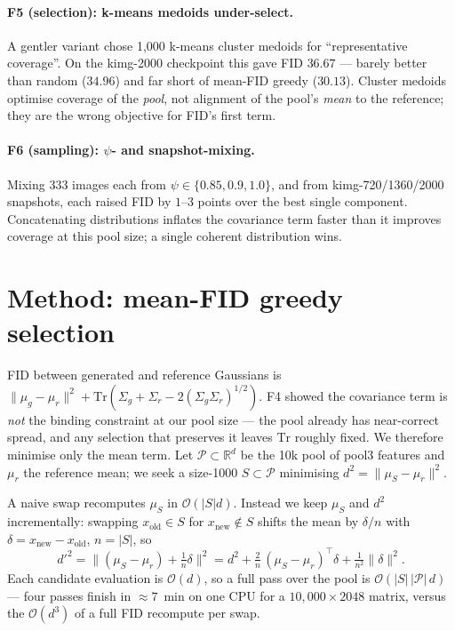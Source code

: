 \documentclass{article}
\begin{document}
\paragraph{F5 (selection): k-means medoids under-select.} A gentler variant
chose 1,000 k-means cluster medoids for ``representative coverage''. On the
kimg-2000 checkpoint this gave FID $36.67$ --- barely better than random
($34.96$) and far short of mean-FID greedy ($30.13$). Cluster medoids optimise
coverage of the \emph{pool}, not alignment of the pool's \emph{mean} to the
reference; they are the wrong objective for FID's first term.

\paragraph{F6 (sampling): $\psi$- and snapshot-mixing.} Mixing 333 images each
from $\psi\in\{0.85,0.9,1.0\}$, and from kimg-720/1360/2000 snapshots, each
raised FID by $1$--$3$ points over the best single component. Concatenating
distributions inflates the covariance term faster than it improves coverage at
this pool size; a single coherent distribution wins.

\section{Method: mean-FID greedy selection}
\label{sec:method}
FID \citep{heusel2017gans} between generated and reference Gaussians is
$\|\mu_g-\mu_r\|^2 + \mathrm{Tr}(\Sigma_g+\Sigma_r-2(\Sigma_g\Sigma_r)^{1/2})$.
F4 showed the covariance term is \emph{not} the binding constraint at our pool
size --- the pool already has near-correct spread, and any selection that
preserves it leaves $\mathrm{Tr}$ roughly fixed. We therefore minimise only the
mean term. Let $\mathcal{P}\subset\mathbb{R}^d$ be the 10k pool of pool3
features and $\mu_r$ the reference mean; we seek a size-1000 $S\subset\mathcal{P}$
minimising $d^2=\|\mu_S-\mu_r\|^2$.

A naive swap recomputes $\mu_S$ in $\mathcal{O}(|S|d)$. Instead we keep $\mu_S$
and $d^2$ incrementally: swapping $x_{\text{old}}\!\in\!S$ for
$x_{\text{new}}\!\notin\!S$ shifts the mean by $\delta/n$ with
$\delta=x_{\text{new}}-x_{\text{old}}$, $n=|S|$, so
\begin{equation}
d'^2 = \Big\|(\mu_S-\mu_r)+\tfrac{1}{n}\delta\Big\|^2
     = d^2 + \tfrac{2}{n}\,(\mu_S-\mu_r)^{\!\top}\delta + \tfrac{1}{n^2}\|\delta\|^2 .
\label{eq:update}
\end{equation}
Each candidate evaluation is $\mathcal{O}(d)$, so a full pass over the pool is
$\mathcal{O}(|S|\,|\mathcal{P}|\,d)$ --- four passes finish in $\approx 7$~min on
one CPU for a $10{,}000\!\times\!2048$ matrix, versus the $\mathcal{O}(d^3)$ of a
full FID recompute per swap.
\end{document}
